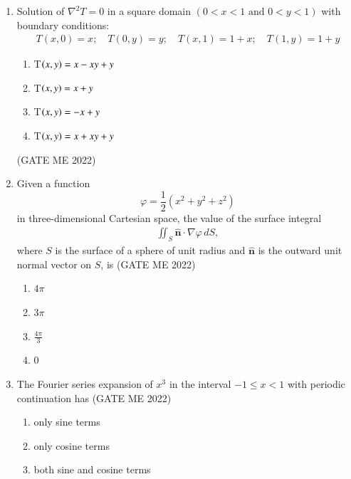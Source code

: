 \documentclass[journal]{IEEEtran}
\numberwithin{equation}{enumi}
\numberwithin{figure}{enumi}
\begin{document}
\begin{enumerate}
\item Solution of \(\nabla^2 T = 0\) in a square domain \((0 < x < 1 \text{ and } 0 < y < 1)\) with boundary conditions:
\begin{align*}
 T(x,0) = x; \quad T(0,y) = y; \quad T(x,1) = 1 + x; \quad T(1,y) = 1 + y   
\end{align*}
\begin{enumerate}
    \item T$\left(x,y\right) = x - xy + y$
    \item  T$\left(x,y\right) = x + y$
    \item T$\left(x,y\right) = -x+y$
    \item T$\left(x,y\right) =x+xy+y$
\end{enumerate}
\hfill{(GATE ME 2022)}
\item Given a function 
\[
\varphi = \frac{1}{2}(x^2 + y^2 + z^2)
\]
in three-dimensional Cartesian space, the value of the surface integral
\begin{align*}
\iint_{S} \mathbf{\hat{n}} \cdot \nabla \varphi \, dS,
\end{align*}
where \( S \) is the surface of a sphere of unit radius and \( \mathbf{\hat{n}} \) is the outward unit normal vector on \( S \), is
\hfill{(GATE ME 2022)}
\begin{multicols}{4}
\begin{enumerate}
    \item$ 4\pi$
\item  $3\pi$  
\item $\frac{4\pi}{3}$ 
\item 0
\end{enumerate}
\end{multicols}

\item The Fourier series expansion of $x^3$ in the interval $-1 \le x < 1$ with periodic continuation has
\hfill{(GATE ME 2022)}
\begin{enumerate}
    \item only sine terms

\item only cosine terms

\item both sine and cosine terms


\end{enumerate}
\end{enumerate}
\end{document}
